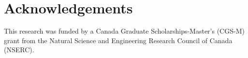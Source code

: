 
\chapter{Acknowledgements}

This research was funded by a Canada Graduate Scholarships-Master’s (CGS-M) grant from the Natural Science and Engineering Research Council of Canada (NSERC).